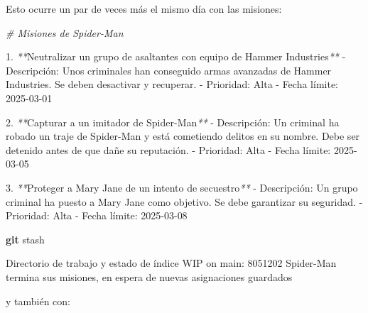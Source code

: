 \documentclass[
]{book}
\newenvironment{Shaded}{\begin{snugshade}}{\end{snugshade}}
\newcommand{\CommentTok}[1]{\textcolor[rgb]{0.56,0.35,0.01}{\textit{#1}}}
\newcommand{\ExtensionTok}[1]{#1}
\newcommand{\FunctionTok}[1]{\textcolor[rgb]{0.13,0.29,0.53}{\textbf{#1}}}
\newcommand{\NormalTok}[1]{#1}
\newcommand{\PreprocessorTok}[1]{\textcolor[rgb]{0.56,0.35,0.01}{\textit{#1}}}
\begin{document}
Esto ocurre un par de veces más el mismo día con las misiones:

\begin{Shaded}
\begin{Highlighting}[]
\CommentTok{\# Misiones de Spider{-}Man}

\ExtensionTok{1.} \PreprocessorTok{**}\NormalTok{Neutralizar un grupo de asaltantes con equipo de Hammer Industries}\PreprocessorTok{**}
   \ExtensionTok{{-}}\NormalTok{ Descripción: Unos criminales han conseguido armas avanzadas de Hammer Industries. Se deben desactivar y recuperar.}
   \ExtensionTok{{-}}\NormalTok{ Prioridad: Alta}
   \ExtensionTok{{-}}\NormalTok{ Fecha límite: 2025{-}03{-}01}

\ExtensionTok{2.} \PreprocessorTok{**}\NormalTok{Capturar a un imitador de Spider{-}Man}\PreprocessorTok{**}
   \ExtensionTok{{-}}\NormalTok{ Descripción: Un criminal ha robado un traje de Spider{-}Man y está cometiendo delitos en su nombre. Debe ser detenido antes de que dañe su reputación.}
   \ExtensionTok{{-}}\NormalTok{ Prioridad: Alta}
   \ExtensionTok{{-}}\NormalTok{ Fecha límite: 2025{-}03{-}05}

\ExtensionTok{3.} \PreprocessorTok{**}\NormalTok{Proteger a Mary Jane de un intento de secuestro}\PreprocessorTok{**}
   \ExtensionTok{{-}}\NormalTok{ Descripción: Un grupo criminal ha puesto a Mary Jane como objetivo. Se debe garantizar su seguridad.}
   \ExtensionTok{{-}}\NormalTok{ Prioridad: Alta}
   \ExtensionTok{{-}}\NormalTok{ Fecha límite: 2025{-}03{-}08}
\end{Highlighting}
\end{Shaded}

\begin{Shaded}
\begin{Highlighting}[]
\FunctionTok{git}\NormalTok{ stash}
\end{Highlighting}
\end{Shaded}

\begin{Shaded}
\begin{Highlighting}[]
\ExtensionTok{Directorio}\NormalTok{ de trabajo y estado de índice WIP on main: 8051202 Spider{-}Man termina sus misiones, en espera de nuevas asignaciones guardados}
\end{Highlighting}
\end{Shaded}

y también con:
\end{document}
